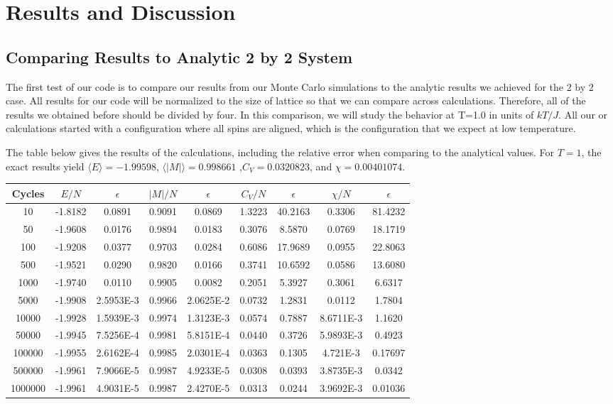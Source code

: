 \documentclass[%
oneside,                 %
final,                   %
10pt]{article}
\begin{document}
\section{Results and Discussion}

\subsection{Comparing Results to Analytic 2 by 2 System}

The first test of our code is to compare our results from our Monte Carlo simulations to the analytic results we achieved for the 2 by 2 case.  All results for our code will be normalized to the size of lattice so that we can compare across calculations.  Therefore, all of the results we obtained before should be divided by four.  In this comparison, we will study the behavior at T=1.0 in units of $kT/J$.  All our or calculations started with a configuration where all spins are aligned, which is the configuration that we expect at low temperature.

The table below gives the results of the calculations, including the relative error when comparing to the analytical values.  For $T=1$, the exact results yield $\langle E \rangle = -1.99598$, $\langle |M| \rangle = 0.998661$ ,$C_V = 0.0320823 $, and $ \chi = 0.00401074$.

\begin{center} 
\begin{tabular}{ |c|c|c|c|c|c|c|c|c| }
\hline
Cycles & $E/N$ & $\epsilon$ & $|M|/N$ & $\epsilon$ &  $C_V/N$ & $\epsilon$ & $\chi/N$ & $\epsilon$ \\
\hline
10 & -1.8182 & 0.0891 & 0.9091 & 0.0869 & 1.3223 & 40.2163 & 0.3306 & 81.4232 \\
50 & -1.9608 & 0.0176 & 0.9894 & 0.0183 & 0.3076 & 8.5870 & 0.0769 & 18.1719 \\
100 & -1.9208 & 0.0377 & 0.9703 &  0.0284 & 0.6086 & 17.9689 & 0.0955 & 22.8063 \\
500 & -1.9521 & 0.0290 & 0.9820 & 0.0166 & 0.3741 & 10.6592 & 0.0586 & 13.6080 \\
1000 & -1.9740 & 0.0110 & 0.9905 & 0.0082 & 0.2051 & 5.3927 & 0.3061 & 6.6317 \\
5000 & -1.9908 & 2.5953E-3 & 0.9966 & 2.0625E-2 & 0.0732 & 1.2831 & 0.0112 & 1.7804 \\
10000 & -1.9928 & 1.5939E-3 & 0.9974 & 1.3123E-3 & 0.0574 & 0.7887 & 8.6711E-3&1.1620 \\
50000 &-1.9945 & 7.5256E-4 & 0.9981& 5.8151E-4& 0.0440 & 0.3726 & 5.9893E-3&0.4923 \\
100000 & -1.9955 & 2.6162E-4 & 0.9985 & 2.0301E-4& 0.0363 & 0.1305 & 4.721E-3&0.17697\\
500000 & -1.9961 & 7.9066E-5 & 0.9987 & 4.9233E-5&0.0308&0.0393&3.8735E-3& 0.0342 \\
1000000&-1.9961 &4.9031E-5 & 0.9987 & 2.4270E-5&0.0313&0.0244&3.9692E-3&0.01036 \\
\hline
\end{tabular}

\label{table:test}
\end{center}
\end{document}
